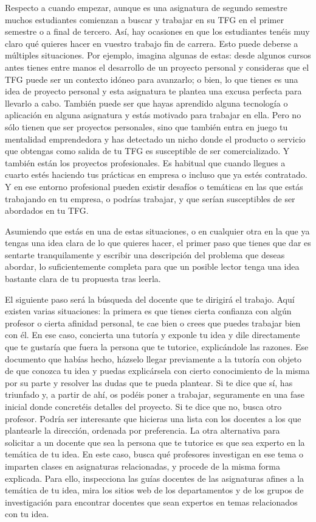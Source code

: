 Respecto a cuando empezar, aunque es una asignatura de segundo semestre muchos estudiantes comienzan a buscar y trabajar en su TFG en el primer semestre o a final de tercero. Así, hay ocasiones en que los estudiantes tenéis muy claro qué quieres hacer en vuestro trabajo fin de carrera. Esto puede deberse a múltiples situaciones. Por ejemplo, imagina algunas de estas: desde algunos cursos antes tienes entre manos el desarrollo de un proyecto personal y consideras que el TFG puede ser un contexto idóneo para avanzarlo; o bien, lo que tienes es una idea de proyecto personal y esta asignatura te plantea una excusa perfecta para llevarlo a cabo. También puede ser que hayas aprendido alguna tecnología o aplicación en alguna asignatura y estás motivado para trabajar en ella. Pero no sólo tienen que ser proyectos personales, sino que también entra en juego tu mentalidad emprendedora y has detectado un nicho donde el producto o servicio que obtengas como salida de tu TFG es susceptible de ser comercializado. Y también están los proyectos profesionales. Es habitual que cuando llegues a cuarto estés haciendo tus prácticas en empresa o incluso que ya estés contratado. Y en ese entorno profesional pueden existir desafíos o temáticas en las que estás trabajando en tu empresa, o podrías trabajar, y que serían susceptibles de ser abordados en tu TFG.

Asumiendo que estás en una de estas situaciones, o en cualquier otra en la que ya tengas una idea clara de lo que quieres hacer, el primer paso que tienes que dar es sentarte tranquilamente y escribir una descripción del problema que deseas abordar, lo suficientemente completa para que un posible lector tenga una idea bastante clara de tu propuesta tras leerla. 

El siguiente paso será la búsqueda del docente que te dirigirá el trabajo. Aquí existen varias situaciones: la primera es que tienes cierta confianza con algún profesor o cierta afinidad personal, te cae bien o crees que puedes trabajar bien con él. En ese caso, concierta una tutoría y exponle tu idea y dile directamente que te gustaría que fuera la persona que te tutorice, explicándole las razones. Ese documento que habías hecho, házselo llegar previamente a la tutoría con objeto de que conozca tu idea y puedas explicársela con cierto conocimiento de la misma por su parte y resolver las dudas que te pueda plantear. Si te dice que sí, has triunfado y, a partir de ahí, os podéis poner a trabajar, seguramente en una fase inicial donde concretéis detalles del proyecto. Si te dice que no, busca otro profesor. Podría ser interesante que hicieras una lista con los docentes a los que plantearle la dirección, ordenada por preferencia. La otra alternativa para solicitar a un docente que sea la persona que te tutorice es que sea experto en la temática de tu idea. En este caso, busca qué profesores investigan en ese tema o imparten clases en asignaturas relacionadas, y procede de la misma forma explicada. Para ello, inspecciona las guías docentes de las asignaturas afines a la temática de tu idea, mira los sitios web de los departamentos y de los grupos de investigación para encontrar docentes que sean expertos en temas relacionados con tu idea. 

